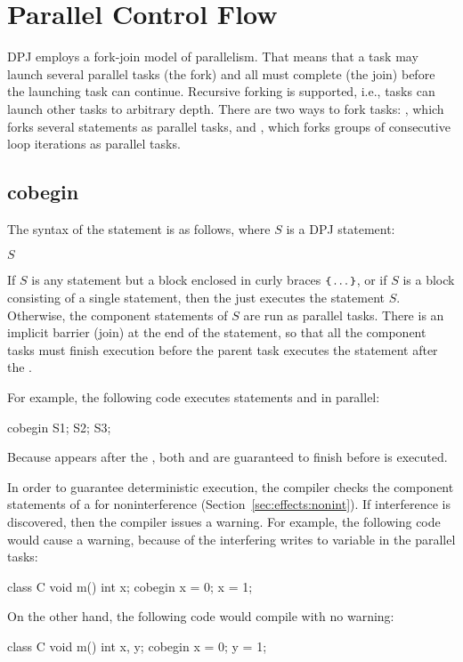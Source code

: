 \section{Parallel Control Flow%
\label{sec:parallel}}

DPJ employs a fork-join model of parallelism.  That means that a task
may launch several parallel tasks (the fork) and all must complete
(the join) before the launching task can continue.  Recursive forking
is supported, i.e., tasks can launch other tasks to arbitrary depth.
There are two ways to fork tasks: , which forks several
statements as parallel tasks, and , which forks groups of
consecutive loop iterations as parallel tasks.

\subsection{cobegin
\label{sec:parallel:cobegin}}

The syntax of the  statement is as follows, where $S$ is
a DPJ statement:
%
\begin{description}
\item {} $S$
\end{description}
%
If $S$ is any statement but a block enclosed in curly braces $\mbox{\small{\texttt{\{}}}
\ldots \mbox{\small{\texttt{\}}}}$, or if $S$ is a block consisting of a single
statement, then the  just executes the statement $S$.
Otherwise, the component statements of $S$ are run as parallel tasks.
There is an implicit barrier (join) at the end of the 
statement, so that all the component tasks must finish execution
before the parent task executes the statement after the .

For example, the following code executes statements  and
 in parallel:
%
\begin{dpjlisting}
cobegin {
  S1;
  S2;
}
S3;
\end{dpjlisting}
%
Because  appears after the , both  and
 are guaranteed to finish before  is executed.

In order to guarantee deterministic execution, the compiler checks the
component statements of a  for noninterference
(Section~\ref{sec:effects:nonint}).  If interference is discovered,
then the compiler issues a warning.  For example, the following code
would cause a warning, because of the interfering writes to variable
 in the parallel tasks:
%
\begin{dpjlisting}
class C {
  void m() {
    int x;
    cobegin {
      x = 0;
      x = 1;
    }
  }
}
\end{dpjlisting}
%
On the other hand, the following code would compile with no warning:
%
\begin{dpjlisting}
class C {
  void m() {
    int x, y;
    cobegin {
      x = 0;
      y = 1;
    }
  }
}
\end{dpjlisting}
%

